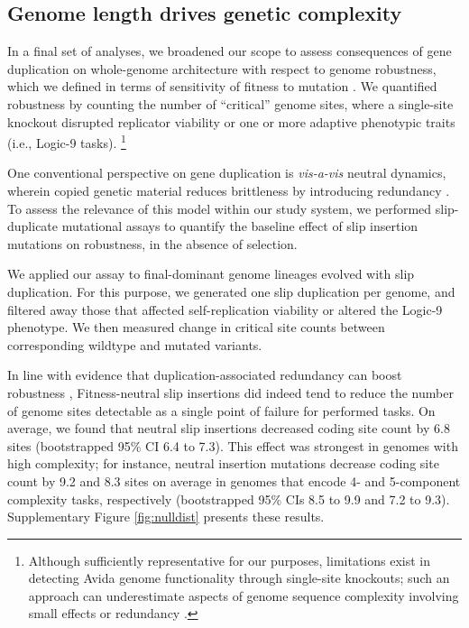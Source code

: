 \subsection{Genome length drives genetic complexity}



In a final set of analyses, we broadened our scope to assess consequences of gene duplication on whole-genome architecture with respect to genome robustness, which we defined in terms of sensitivity of fitness to mutation \citep{lenski1999genome}.
We quantified robustness by counting the number of ``critical'' genome sites, where a single-site knockout disrupted replicator viability or one or more adaptive phenotypic traits (i.e., Logic-9 tasks).
\footnote{%
Although sufficiently representative for our purposes, limitations exist in detecting Avida genome functionality through single-site knockouts; such an approach can underestimate aspects of genome sequence complexity involving small effects or redundancy \citep{lenski1999genome,moreno2024cryptic}.
}

One conventional perspective on gene duplication is \textit{vis-a-vis} neutral dynamics, wherein copied genetic material reduces brittleness by introducing redundancy \citep{wagner1996genetic}.
To assess the relevance of this model within our study system, we performed slip-duplicate mutational assays to quantify the baseline effect of slip insertion mutations on robustness, in the absence of selection.

We applied our assay to final-dominant genome lineages evolved with slip duplication.
For this purpose, we generated one slip duplication per genome, and filtered away those that affected self-replication viability or altered the Logic-9 phenotype.
We then measured change in critical site counts between corresponding wildtype and mutated variants.

In line with evidence that duplication-associated redundancy can boost robustness \citep{Lynch2000}, Fitness-neutral slip insertions did indeed tend to reduce the number of genome sites detectable as a single point of failure for performed tasks.
On average, we found that neutral slip insertions decreased coding site count by 6.8 sites (bootstrapped 95\% CI 6.4 to 7.3).
This effect was strongest in genomes with high complexity; for instance, neutral insertion mutations decrease coding site count by 9.2 and 8.3 sites on average in genomes that encode 4- and 5-component complexity tasks, respectively (bootstrapped 95\% CIs 8.5 to 9.9 and 7.2 to 9.3).
Supplementary Figure \ref{fig:nulldist} presents these results.

